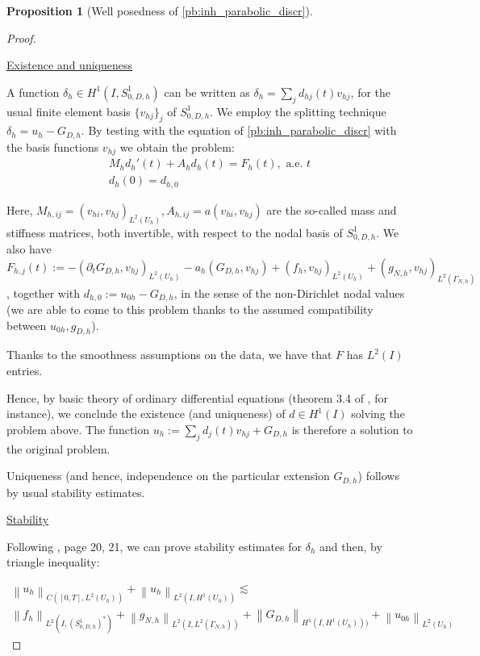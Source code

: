 \documentclass[english,a4paper,10pt,oneside]{scrbook}	%
\theoremstyle{break}
\newtheorem{prop}[equation]{Proposition}
\newenvironment{mproof}[1][\proofname]{%
  \begin{proof}[#1]$ $\par\nobreak\ignorespaces
}{%
  \end{proof}
}
\renewcommand*{\proofname}{Proof}
\theoremstyle{remark}
\newcommand{\norm}[1]{\left\lVert#1\right\rVert}
\begin{document}
\begin{appendices}
\begin{prop}[Well posedness of \cref{pb:inh_parabolic_discr}]
\end{prop}

\begin{mproof}

\underline{Existence and uniqueness}

A function $\delta_h \in H^1(I, S^1_{0,D,h})$ can be written as $\delta_h=\sum_j d_{hj}(t)v_{hj}$, for the usual finite element basis $\{v_{hj}\}_j$ of $S^1_{0,D,h}$. We employ the splitting technique $\delta_h = u_h - G_{D,h}$. By testing with the equation of \cref{pb:inh_parabolic_discr} with the basis functions $v_{hj}$ we obtain the problem:
\begin{align}
\label{eqn:ode}
	M_h d_h'(t)+A_hd_h(t)= F_h(t), \text{ a.e. } t\\
	d_h(0) = d_{h,0}	
\end{align}

Here, $M_{h,ij} = (v_{hi}, v_{hj})_{L^2(U_h)}, A_{h,ij} = a(v_{hi}, v_{hj})$ are the so-called mass and stiffness matrices, both invertible, with respect to the nodal basis of $S^1_{0,D,h}$. We also have $F_{h,j}(t):= - (\partial_t G_{D,h}, v_{hj})_{L^2(U_h)} - a_h(G_{D,h}, v_{hj}) + (f_h, v_{hj})_{L^2(U_h)} + (g_{N,h}, v_{hj})_{L^2(\Gamma_{N,h})}$, together with $d_{h,0}:= u_{0h} - G_{D,h}$, in the sense of the non-Dirichlet nodal values (we are able to come to this problem thanks to the assumed compatibility between $u_{0h}, g_{D,h}$).

Thanks to the smoothness assumptions on the data, we have that $F$ has $L^2(I)$ entries.

Hence, by basic theory of ordinary differential equations (theorem 3.4 of \cite{odes}, for instance), we conclude the existence (and uniqueness) of $d \in H^1(I)$ solving the problem above. The function $u_h:=\sum_j d_j(t)v_{hj} + G_{D,h}$ is therefore a solution to the original problem. 

Uniqueness (and hence, independence on the particular extension $G_{D,h}$) follows by usual stability estimates.

\underline{Stability}

Following \cite{gilardi}, page 20, 21, we can prove stability estimates for $\delta_h$ and then, by triangle inequality:

\begin{align*}
	\norm{u_h}_{C([0,T],L^2(U_h))} + \norm{u_h}_{L^2(I,H^1(U_h))}\lesssim \\\norm{f_h}_{L^2(I,(S^1_{0,D,h})^*)} + \norm{g_{N,h}}_{L^2(I,L^2(\Gamma_{N,h}))} + \norm{G_{D,h}}_{H^1(I,H^1(U_h)))}+\norm{u_{0h}}_{L^2(U_h)}
\end{align*}


\end{mproof}
\end{appendices}
\end{document}
